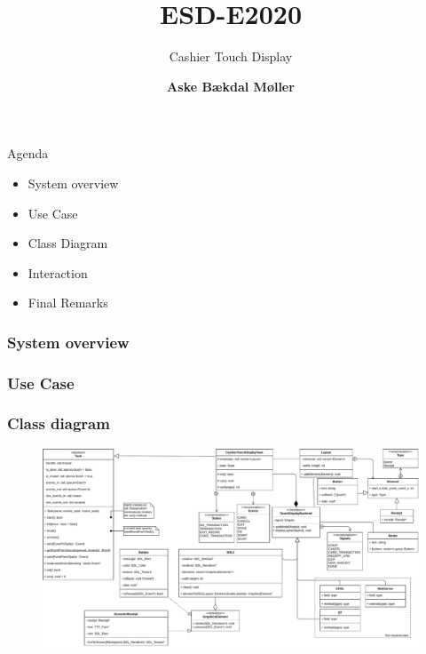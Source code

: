 \documentclass[aspectratio=169,10pt,t]{beamer}
\title{ESD-E2020}
\subtitle{Cashier Touch Display}
\date{ }
\author{
  \textbf{Aske Bækdal Møller}
}
\institute[
  SDU Robotics\\
  The Maersk Mc-Kinney Moller Institute\\
  University of Southern Denmark
] %
{%
  SDU Robotics\\
  The Maersk Mc-Kinney Moller Institute\\
  University of Southern Denmark

}
\begin{document}
{\SDUwavesbg%
\begin{frame} %
  \titlepage
\end{frame}}

\begin{frame}{Agenda}{\vphantom{(y}}
	\begin{itemize}
		\item System overview
		\item Use Case
		\item Class Diagram
		\item Interaction
		\item Final Remarks
	\end{itemize}
\end{frame}

\begin{frame}[t]
	\frametitle{System overview}

	\begin{figure}[h]
		\centering
	\end{figure}
	
\end{frame}

\begin{frame}[t]
	\frametitle{Use Case}
	\begin{figure}[h]
		\centering
	\end{figure}
	
\end{frame}

\begin{frame}[t]
	\frametitle{Class diagram}
	\vspace{-0.45cm}
	\begin{figure}[h]
		\centering
		\includegraphics[width=\textwidth]{images/class-diagram.pdf}
	\end{figure}
\end{frame}
\end{document}
